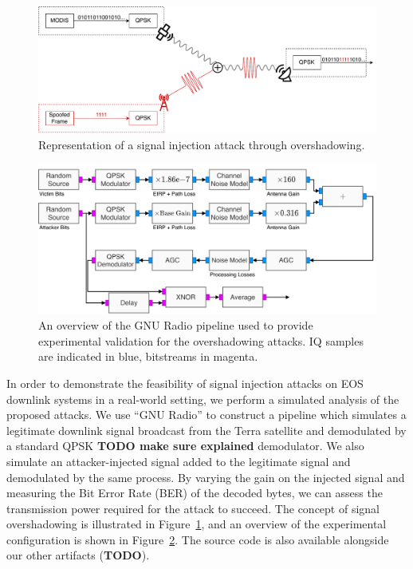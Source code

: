 \begin{figure}
    \centering
    \includegraphics[width=\columnwidth]{diagrams/overshadowing_demo.pdf}
    \caption{Representation of a signal injection attack through overshadowing.}
    \label{fig:overshadowing_demo}
\end{figure}

\begin{figure}
    \centering
    \includegraphics[width=\columnwidth]{diagrams/overshadowing_pipeline.pdf}
    \caption{An overview of the GNU Radio pipeline used to provide experimental validation for the overshadowing attacks. IQ samples are indicated in blue, bitstreams in magenta.}
    \label{fig:overshadowing_pipeline}
\end{figure}

In order to demonstrate the feasibility of signal injection attacks on EOS downlink systems in a real-world setting, we perform a simulated analysis of the proposed attacks.
We use ``GNU Radio'' to construct a pipeline which simulates a legitimate downlink signal broadcast from the Terra satellite and demodulated by a standard QPSK \textbf{TODO make sure explained} demodulator.
We also simulate an attacker-injected signal added to the legitimate signal and demodulated by the same process.
By varying the gain on the injected signal and measuring the Bit Error Rate (BER) of the decoded bytes, we can assess the transmission power required for the attack to succeed.
The concept of signal overshadowing is illustrated in Figure~\ref{fig:overshadowing_demo}, and an overview of the experimental configuration is shown in Figure~\ref{fig:overshadowing_pipeline}.
The source code is also available alongside our other artifacts (\textbf{TODO}).


